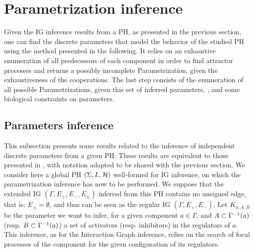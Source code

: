 \section{Parametrization inference}\label{sec:infer-K}

Given the IG inference results from a PH, as presented in the previous section, one can find the discrete parameters that model the behavior of the studied PH using the method presented in the following.
It relies on an exhaustive enumeration of all predecessors of each component in order to find attractor processes and returns a possibly incomplete Parametrization, given the exhaustiveness of the cooperations.
The last step consists of the enumeration of all possible Parametrizations, given this set of
inferred parameters, , and some biological constraints on parameters.

\subsection{Parameters inference}

This subsection presents some results related to the inference of independent discrete parameters from a given PH. These results are equivalent to those presented in \cite{PMR10-TCSB}, with notation adapted to be shared with the previous section.
We consider here a global PH $(\Sigma,L,\mathcal{H})$ well-formed for IG inference, on which the parametrization inference has now to be performed. We suppose that the extended IG $(\Gamma, E_+, E_-, E_\pm)$ inferred from this PH contains no unsigned edge, that is: $E_\pm = \emptyset$, and thus can be seen as the regular IG $(\Gamma, E_+, E_-)$.
Let $K_{a,A,B}$ be the parameter we want to infer, for a given component $a \in \Gamma$,
and $A \subset \Gamma^{-1}(a)$ (resp. $B \subset \Gamma^{-1}(a)$) a set of activators (resp. inhibitors) in the regulators of $a$.
This inference, as for the Interaction Graph inference, relies on the search of focal processes of the component for the given configuration of its regulators.

